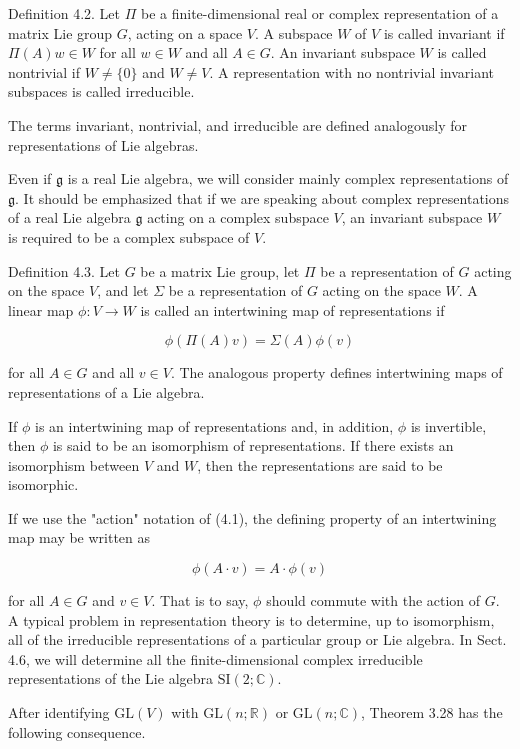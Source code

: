 \documentclass[10pt, letterpaper]{article}
\begin{document}
Definition 4.2. Let $\Pi$ be a finite-dimensional real or complex representation of a matrix Lie group $G$, acting on a space $V$. A subspace $W$ of $V$ is called invariant if $\Pi(A) w \in W$ for all $w \in W$ and all $A \in G$. An invariant subspace $W$ is called nontrivial if $W \neq\{0\}$ and $W \neq V$. A representation with no nontrivial invariant subspaces is called irreducible.

The terms invariant, nontrivial, and irreducible are defined analogously for representations of Lie algebras.

Even if $\mathfrak{g}$ is a real Lie algebra, we will consider mainly complex representations of $\mathfrak{g}$. It should be emphasized that if we are speaking about complex representations of a real Lie algebra $\mathfrak{g}$ acting on a complex subspace $V$, an invariant subspace $W$ is required to be a complex subspace of $V$.

Definition 4.3. Let $G$ be a matrix Lie group, let $\Pi$ be a representation of $G$ acting on the space $V$, and let $\Sigma$ be a representation of $G$ acting on the space $W$. A linear map $\phi: V \rightarrow W$ is called an intertwining map of representations if

$$
\phi(\Pi(A) v)=\Sigma(A) \phi(v)
$$

for all $A \in G$ and all $v \in V$. The analogous property defines intertwining maps of representations of a Lie algebra.

If $\phi$ is an intertwining map of representations and, in addition, $\phi$ is invertible, then $\phi$ is said to be an isomorphism of representations. If there exists an isomorphism between $V$ and $W$, then the representations are said to be isomorphic.

If we use the "action" notation of (4.1), the defining property of an intertwining map may be written as

$$
\phi(A \cdot v)=A \cdot \phi(v)
$$

for all $A \in G$ and $v \in V$. That is to say, $\phi$ should commute with the action of $G$. A typical problem in representation theory is to determine, up to isomorphism, all of the irreducible representations of a particular group or Lie algebra. In Sect. 4.6, we will determine all the finite-dimensional complex irreducible representations of the Lie algebra $\mathrm{SI}(2 ; \mathbb{C})$.

After identifying $\mathrm{GL}(V)$ with $\mathrm{GL}(n ; \mathbb{R})$ or $\mathrm{GL}(n ; \mathbb{C})$, Theorem 3.28 has the following consequence.
\end{document}
